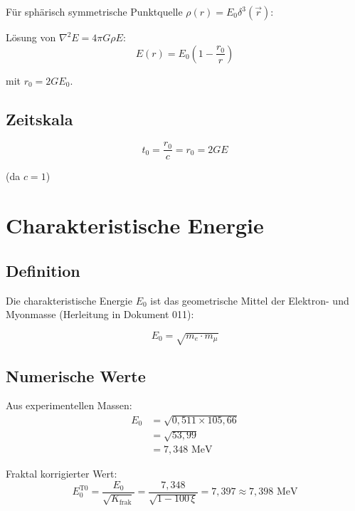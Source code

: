 	Für sphärisch symmetrische Punktquelle $\rho(r) = E_0 \delta^3(\vec{r})$:
	
	Lösung von $\nabla^2 E = 4\pi G \rho E$:
	\begin{equation}
		E(r) = E_0 \left(1 - \frac{r_0}{r}\right)
	\end{equation}
	
	mit $r_0 = 2GE_0$.
	
	\subsection{Zeitskala}
	
	\begin{equation}
		t_0 = \frac{r_0}{c} = r_0 = 2GE
	\end{equation}
	
	(da $c = 1$)
	
	\section{Charakteristische Energie}
	\label{sec:characteristic_energy}
	
	\subsection{Definition}
	
	Die charakteristische Energie $E_0$ ist das geometrische Mittel der Elektron- und Myonmasse (Herleitung in Dokument 011):
	
	\begin{equation}
		\boxed{E_0 = \sqrt{m_e \cdot m_\mu}}
		\label{eq:E0_definition}
	\end{equation}
	
	\subsection{Numerische Werte}
	
	Aus experimentellen Massen:
	\begin{align}
		E_0 &= \sqrt{0{,}511 \times 105{,}66} \\
		&= \sqrt{53{,}99} \\
		&= 7{,}348 \text{ MeV}
	\end{align}
	
	Fraktal korrigierter Wert:
	\begin{equation}
		E_0^{\text{T0}} = \frac{E_0}{\sqrt{K_{\text{frak}}}} = \frac{7{,}348}{\sqrt{1 - 100\,\xi}} = 7{,}397 \approx 7{,}398 \text{ MeV}
	\end{equation}

